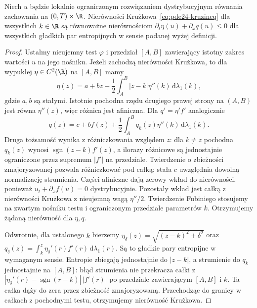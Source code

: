 \begin{lemat}
\label{lem:pde24-entropy-equivalence}
Niech $u$ będzie lokalnie ograniczonym rozwiązaniem
dystrybucyjnym równania zachowania na $(0,T)\times\R$.
Nierówności Krużkowa~\eqref{eq:pde24-kruzineq} dla
wszystkich $k\in\R$ są równoważne nierównościom
$\partial_t\eta(u)+\partial_xq(u)\le0$ dla wszystkich
gładkich par entropijnych w sensie podanej wyżej definicji.
\end{lemat}
\begin{proof}
Ustalmy nieujemny test $\varphi$ i przedział $[A,B]$
zawierający istotny zakres wartości $u$ na jego nośniku.
Jeżeli zachodzą nierówności Krużkowa, to dla wypukłej
$\eta\in C^2(\R)$ na $[A,B]$ mamy
\[
 \eta(z)=a+bz+\frac12\int_A^B |z-k|\eta''(k)\,
                         \mathrm d\lambda_1(k),
\]
gdzie $a,b$ są stałymi. Istotnie pochodna rzędu
drugiego prawej strony na $(A,B)$ jest równa
$\eta''(z)$, więc różnica jest afiniczna.
Dla $q'=\eta'f'$ analogicznie
\[
 q(z)=c+bf(z)+\frac12\int_A^B q_k(z)\eta''(k)\,
                         \mathrm d\lambda_1(k).
\]
Druga tożsamość wynika z różniczkowania względem
$z$: dla $k\ne z$ pochodna $q_k(z)$ wynosi
$\operatorname{sgn}(z-k)f'(z)$, a ilorazy różnicowe
są jednostajnie ograniczone przez supremum $|f'|$
na przedziale. Twierdzenie o zbieżności zmajoryzowanej
pozwala różniczkować pod całką; stała $c$ uwzględnia
dowolną normalizację strumienia.
Części afiniczne dają zerowy wkład do nierówności,
ponieważ $u_t+\partial_x f(u)=0$ dystrybucyjnie.
Pozostały wkład jest całką z nierówności Krużkowa
z nieujemną wagą $\eta''/2$. Twierdzenie Fubiniego
stosujemy na zwartym nośniku testu i ograniczonym
przedziale parametrów $k$. Otrzymujemy żądaną
nierówność dla $\eta,q$.

Odwrotnie, dla ustalonego $k$ bierzemy
$\eta_\delta(z)=\sqrt{(z-k)^2+\delta^2}$ oraz
$q_\delta(z)=\int_k^z\eta_\delta'(r)f'(r)\,
\mathrm d\lambda_1(r)$. Są to gładkie pary entropijne
w wymaganym sensie. Entropie zbiegają jednostajnie
do $|z-k|$, a strumienie do $q_k$ jednostajnie na
$[A,B]$: błąd strumienia nie przekracza całki
z $|\eta_\delta'(r)-\operatorname{sgn}(r-k)|\,|f'(r)|$
po przedziale zawierającym $[A,B]$ i $k$.
Ta całka dąży do zera przez zbieżność zmajoryzowaną.
Przechodząc do granicy w całkach z pochodnymi testu,
otrzymujemy nierówność Krużkowa.
\end{proof}

